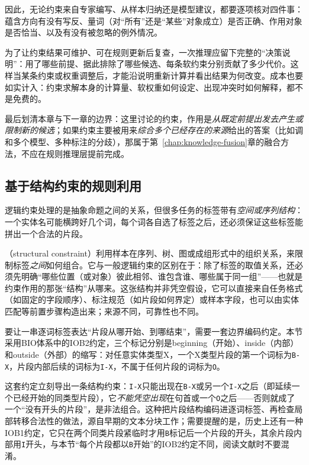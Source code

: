 因此，无论约束来自专家编写、从样本归纳还是模型建议，都要逐项核对四件事：蕴含方向有没有写反、量词（对“所有”还是“某些”对象成立）是否正确、作用对象是否恰当、以及有没有被忽略的例外情况。

为了让约束结果可维护、可在规则更新后复查，一次推理应留下完整的“决策说明”：用了哪些前提、据此排除了哪些候选、每条软约束分别贡献了多少代价。这样当某条约束或权重调整后，才能沿说明重新计算并看出结果为何改变。成本也要如实计入：约束求解本身的计算量、软权重如何设定、出现冲突时如何解释，都不是免费的。

最后划清本章与下一章的边界：这里讨论的约束，作用是\emph{从既定前提出发去产生或限制新的候选}；如果约束主要被用来\emph{综合多个已经存在的来源}给出的答案（比如调和多个模型、多种标注的分歧），那属于第~\ref{chap:knowledge-fusion}章的融合方法，不应在规则推理层提前完成。

\subsection{基于结构约束的规则利用}
\label{sec:rule-based-knowledge-acquisition-structural-constraint}

逻辑约束处理的是抽象命题之间的关系，但很多任务的标签带有\emph{空间或序列结构}：一个实体名可能横跨好几个词，每个词各自选了标签之后，还必须保证这些标签能拼出一个合法的片段。

（structural constraint）利用样本在序列、树、图或成组形式中的组织关系，来限制标签\emph{之间}如何组合。它与一般逻辑约束的区别在于：除了标签的取值关系，还必须先明确“哪些位置（或对象）彼此相邻、谁包含谁、哪些属于同一组”——也就是约束作用的那张“结构”从哪来。这张结构并非凭空假设，它可以直接来自任务格式（如固定的字段顺序）、标注规范（如片段如何界定）或样本字段，也可以由实体匹配等前置步骤构造出来；来源不同，可靠性也不同。

要让一串逐词标签表达“片段从哪开始、到哪结束”，需要一套边界编码约定。本节采用BIO体系中的IOB2约定，三个标记分别是beginning（开始）、inside（内部）和outside（外部）的缩写：对任意实体类型X，一个X类型片段的第一个词标为\texttt{B-X}，片段内部后续的词标为\texttt{I-X}，不属于任何片段的词标为\texttt{O}。

这套约定立刻导出一条结构约束：\texttt{I-X}只能出现在\texttt{B-X}或另一个\texttt{I-X}之后（即延续一个已经开始的同类型片段），它\emph{不能凭空出现}在句首或一个\texttt{O}之后——否则就成了一个“没有开头的片段”，是非法组合。这种把片段结构编码进逐词标签、再检查局部转移合法性的做法，源自早期的文本分块工作；需要提醒的是，历史上还有一种IOB1约定，它只在两个同类片段紧临时才用\texttt{B}标记后一个片段的开头，其余片段内部用\texttt{I}开头，与本节“每个片段都以\texttt{B}开始”的IOB2约定不同，阅读文献时不要混淆。

